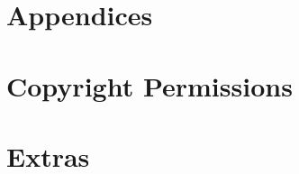 \documentclass[a4paper,10pt,twoside]{article}
\begin{document}
\section{Appendices}

\section{Copyright Permissions}

\section{Extras}
\end{document}
